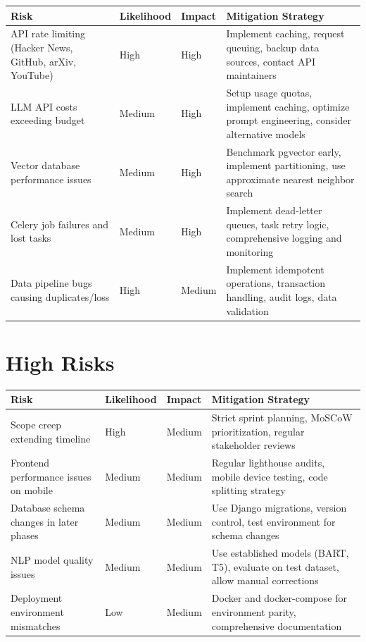 \documentclass[12pt,oneside]{report}
\begin{document}
\begin{table}[h]
\centering
\begin{tabular}{|p{2.5cm}|p{2cm}|p{2cm}|p{3.5cm}|}
\hline
\rowcolor{lightorange}
\textbf{Risk} & \textbf{Likelihood} & \textbf{Impact} & \textbf{Mitigation Strategy} \\
\hline
API rate limiting (Hacker News, GitHub, arXiv, YouTube) & High & High & Implement caching, request queuing, backup data sources, contact API maintainers \\
\hline
LLM API costs exceeding budget & Medium & High & Setup usage quotas, implement caching, optimize prompt engineering, consider alternative models \\
\hline
Vector database performance issues & Medium & High & Benchmark pgvector early, implement partitioning, use approximate nearest neighbor search \\
\hline
Celery job failures and lost tasks & Medium & High & Implement dead-letter queues, task retry logic, comprehensive logging and monitoring \\
\hline
Data pipeline bugs causing duplicates/loss & High & Medium & Implement idempotent operations, transaction handling, audit logs, data validation \\
\hline
\end{tabular}
\end{table}

\section{High Risks}

\begin{table}[h]
\centering
\begin{tabular}{|p{2.5cm}|p{2cm}|p{2cm}|p{3.5cm}|}
\hline
\rowcolor{lightblue}
\textbf{Risk} & \textbf{Likelihood} & \textbf{Impact} & \textbf{Mitigation Strategy} \\
\hline
Scope creep extending timeline & High & Medium & Strict sprint planning, MoSCoW prioritization, regular stakeholder reviews \\
\hline
Frontend performance issues on mobile & Medium & Medium & Regular lighthouse audits, mobile device testing, code splitting strategy \\
\hline
Database schema changes in later phases & Medium & Medium & Use Django migrations, version control, test environment for schema changes \\
\hline
NLP model quality issues & Medium & Medium & Use established models (BART, T5), evaluate on test dataset, allow manual corrections \\
\hline
Deployment environment mismatches & Low & Medium & Docker and docker-compose for environment parity, comprehensive documentation \\
\hline
\end{tabular}
\end{table}
\end{document}
